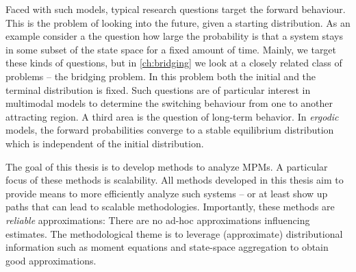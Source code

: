 Faced with such models, typical research questions target the forward behaviour.
This is the problem of looking into the future, given a starting distribution.
As an example consider a the question how large the probability is that a system stays in some subset of the state space for a fixed amount of time.
Mainly, we target these kinds of questions, but in \autoref{ch:bridging} we look at a closely
related class of problems -- the bridging problem.
In this problem both the initial and the terminal distribution is fixed.
Such questions are of particular interest in multimodal models to determine the switching behaviour from one to another attracting region.
A third area is the question of long-term behavior.
In \emph{ergodic} models, the forward probabilities converge to a stable equilibrium distribution which is independent of the initial distribution.

The goal of this thesis is to develop methods to analyze \acp{MPM}.
A particular focus of these methods is scalability.
All methods developed in this thesis aim to provide means to more efficiently analyze such systems -- or at least show up paths that can lead to scalable methodologies.
Importantly, these methods are \emph{reliable} approximations: There are no ad-hoc approximations influencing estimates.
The methodological theme is to leverage (approximate) distributional information such as moment equations and state-space aggregation to obtain good approximations.

